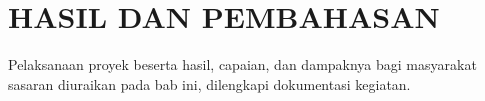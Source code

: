 \chapter{HASIL DAN PEMBAHASAN}
Pelaksanaan proyek beserta hasil, capaian, dan dampaknya bagi masyarakat sasaran diuraikan pada
bab ini, dilengkapi dokumentasi kegiatan.

